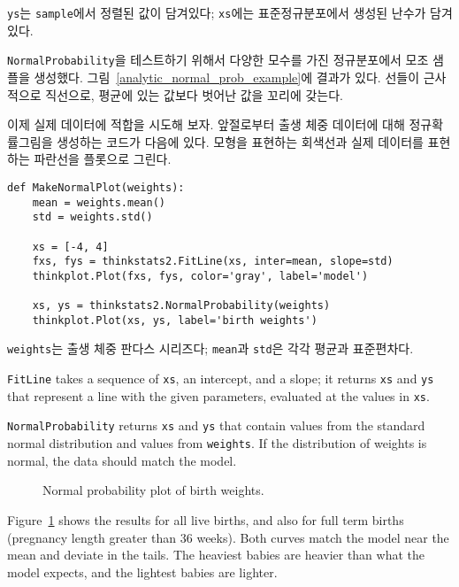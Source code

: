 {\tt ys}는 {\tt sample}에서 정렬된 값이 담겨있다; 
{\tt xs}에는 표준정규분포에서 생성된 난수가 담겨있다.

{\tt NormalProbability}을 테스트하기 위해서 다양한 모수를 가진 
정규분포에서 모조 샘플을 생성했다.
그림~\ref{analytic_normal_prob_example}에 결과가 있다.
선들이 근사적으로 직선으로, 평균에 있는 값보다 벗어난 값을 꼬리에 갖는다.

이제 실제 데이터에 적합을 시도해 보자.
앞절로부터 출생 체중 데이터에 대해 정규확률그림을 생성하는 코드가 다음에 있다.
모형을 표현하는 회색선과 실제 데이터를 표현하는 파란선을 플롯으로 그린다.


\begin{verbatim}
def MakeNormalPlot(weights):
    mean = weights.mean()
    std = weights.std()

    xs = [-4, 4]
    fxs, fys = thinkstats2.FitLine(xs, inter=mean, slope=std)
    thinkplot.Plot(fxs, fys, color='gray', label='model')

    xs, ys = thinkstats2.NormalProbability(weights)
    thinkplot.Plot(xs, ys, label='birth weights')
\end{verbatim}

{\tt weights}는 출생 체중 판다스 시리즈다; {\tt mean}과 {\tt std}은
각각 평균과 표준편차다.



{\tt FitLine} takes a sequence of {\tt xs}, an intercept, and a
slope; it returns {\tt xs} and {\tt ys} that represent a line
with the given parameters, evaluated at the values in {\tt xs}.

{\tt NormalProbability} returns {\tt xs} and {\tt ys} that
contain values from the standard normal distribution and values
from {\tt weights}.  If the distribution of weights is normal,
the data should match the model.

\begin{figure}
\caption{Normal probability plot of birth weights.}
\label{analytic_birthwgt_normal}
\end{figure}

Figure~\ref{analytic_birthwgt_normal} shows the results for
all live births, and also for full term births (pregnancy length greater
than 36 weeks).  Both curves match the model near the mean and
deviate in the tails.  The heaviest babies are heavier than what
the model expects, and the lightest babies are lighter.


